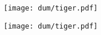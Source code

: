 \documentclass[a4paper]{article}
\makeatletter
\let\orig@includegraphics\includegraphics
\renewcommand\includegraphics[2][]{%
  \message{%
    ^^Jpdfpages file: #2
    ^^Jpdfpages options: #1
    ^^Jpdfpages status: \the\AM@includegraphics@status\space
    ^^J}%
  \orig@includegraphics[#1]{#2}}
\makeatother
\begin{document}
\texttt{[image: dum/tiger.pdf]}



\texttt{[image: dum/tiger.pdf]}

\end{document}
